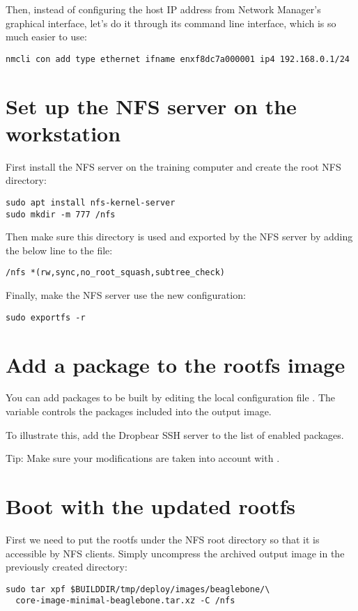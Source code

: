 Then, instead of configuring the host IP address from Network
Manager's graphical interface, let's do it through its command line
interface, which is so much easier to use:

\begin{verbatim}
nmcli con add type ethernet ifname enxf8dc7a000001 ip4 192.168.0.1/24
\end{verbatim}

\section{Set up the NFS server on the workstation}

First install the NFS server on the training computer and create the root NFS
directory:
\begin{verbatim}
sudo apt install nfs-kernel-server
sudo mkdir -m 777 /nfs
\end{verbatim}

Then make sure this directory is used and exported by the NFS server by adding
the below line to the  file:

\begin{verbatim}
/nfs *(rw,sync,no_root_squash,subtree_check)
\end{verbatim}

Finally, make the NFS server use the new configuration:
\begin{verbatim}
sudo exportfs -r
\end{verbatim}

\section{Add a package to the rootfs image}

You can add packages to be built by editing the local configuration file
. The  variable controls the
packages included into the output image.

To illustrate this, add the Dropbear SSH server to the list of enabled
packages.

Tip: Make sure your modifications are taken into account with
.

\section{Boot with the updated rootfs}

First we need to put the rootfs under the NFS root directory so that it is
accessible by NFS clients. Simply uncompress the archived output image in the
previously created  directory:
\begin{verbatim}
sudo tar xpf $BUILDDIR/tmp/deploy/images/beaglebone/\
  core-image-minimal-beaglebone.tar.xz -C /nfs
\end{verbatim}

